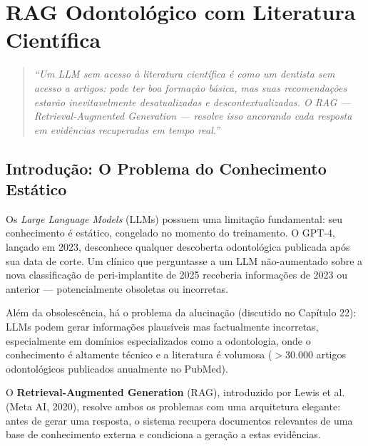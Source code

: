 \chapter{RAG Odontológico com Literatura Científica}
\label{cap:rag-odontologico}
\nivelquatro

\begin{quote}
\textit{``Um LLM sem acesso à literatura científica é como um dentista sem acesso a artigos: pode ter boa formação básica, mas suas recomendações estarão inevitavelmente desatualizadas e descontextualizadas. O RAG --- Retrieval-Augmented Generation --- resolve isso ancorando cada resposta em evidências recuperadas em tempo real.''}
\end{quote}

\section{Introdução: O Problema do Conhecimento Estático}

Os \textit{Large Language Models} (LLMs) possuem uma limitação fundamental: seu conhecimento é estático, congelado no momento do treinamento. O GPT-4, lançado em 2023, desconhece qualquer descoberta odontológica publicada após sua data de corte. Um clínico que perguntasse a um LLM não-aumentado sobre a nova classificação de peri-implantite de 2025 receberia informações de 2023 ou anterior --- potencialmente obsoletas ou incorretas.

Além da obsolescência, há o problema da alucinação (discutido no Capítulo 22): LLMs podem gerar informações plausíveis mas factualmente incorretas, especialmente em domínios especializados como a odontologia, onde o conhecimento é altamente técnico e a literatura é volumosa ($> 30.000$ artigos odontológicos publicados anualmente no PubMed).

O \textbf{Retrieval-Augmented Generation} (RAG), introduzido por Lewis et al. (Meta AI, 2020), resolve ambos os problemas com uma arquitetura elegante: antes de gerar uma resposta, o sistema recupera documentos relevantes de uma base de conhecimento externa e condiciona a geração a estas evidências.

